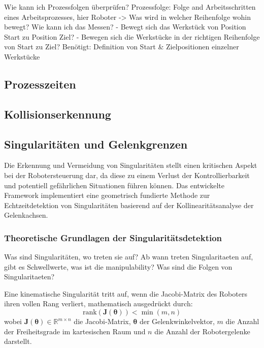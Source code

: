 Wie kann ich Prozessfolgen überprüfen? Prozessfolge: Folge and Arbeitsschritten
eines Arbeitsprozesses, hier Roboter -> Was wird in welcher Reihenfolge wohin
bewegt? Wie kann ich das Messen? - Bewegt sich das Werkstück von Position Start
zu Position Ziel? - Bewegen sich die Werkstücke in der richtigen Reihenfolge
von Start zu Ziel? Benötigt: Definition von Start \& Zielpositionen einzelner
Werkstücke

\subsection{Prozesszeiten}
\label{ssec:Prozesszeiten}
\subsection{Kollisionserkennung}
\label{ssec:Kollisionserkennung}
\subsection{Singularitäten und Gelenkgrenzen}
\label{ssec:Singularitaeten}

Die Erkennung und Vermeidung von Singularitäten stellt einen kritischen Aspekt
bei der Robotersteuerung dar, da diese zu einem Verlust der Kontrollierbarkeit
und potentiell gefährlichen Situationen führen können. Das entwickelte
Framework implementiert eine geometrisch fundierte Methode zur
Echtzeitdetektion von Singularitäten basierend auf der Kollinearitätsanalyse
der Gelenkachsen.

\subsubsection{Theoretische Grundlagen der Singularitätsdetektion}
\label{sssec:Theorie_Singularitaeten}
Was sind Singularitäten, wo treten sie auf?
Ab wann treten Singularitaeten auf, gibt es Schwellwerte, was ist die manipulability?
Was sind die Folgen von Singularitaeten?

Eine kinematische Singularität tritt auf, wenn die Jacobi-Matrix des Roboters
ihren vollen Rang verliert, mathematisch ausgedrückt durch:
\begin{equation}
    \text{rank}(\mathbf{J}(\boldsymbol{\theta})) < \min(m, n)
    \label{eq:singularity_condition}
\end{equation}
wobei $\mathbf{J}(\boldsymbol{\theta}) \in \mathbb{R}^{m \times n}$ die Jacobi-Matrix, $\boldsymbol{\theta}$ der Gelenkwinkelvektor, $m$ die Anzahl der Freiheitsgrade im kartesischen Raum und $n$ die Anzahl der Robotergelenke darstellt.

